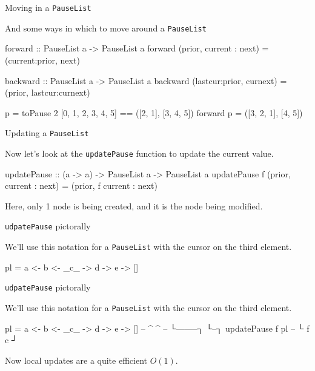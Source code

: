 \documentclass[ignorenonframetext,]{beamer}
\begin{document}
\begin{frame}[fragile]{Moving in a \texttt{PauseList}}

And some ways in which to move around a \texttt{PauseList}

\begin{haskellcode}
forward :: PauseList a -> PauseList a
forward (prior, current : next) = (current:prior, next)

backward :: PauseList a -> PauseList a
backward (lastcur:prior, curnext) = (prior, lastcur:curnext)
\end{haskellcode}

\pause

\begin{haskellcode}
p = toPause 2 [0, 1, 2, 3, 4, 5] == ([2, 1], [3, 4, 5])
forward p = ([3, 2, 1], [4, 5])
\end{haskellcode}

\end{frame}

\begin{frame}[fragile]{Updating a \texttt{PauseList}}

Now let's look at the \texttt{updatePause} function to update the
current value.

\begin{haskellcode}
updatePause :: (a -> a) -> PauseList a -> PauseList a
updatePause f (prior, current : next) = (prior, f current : next)
\end{haskellcode}

Here, only 1 node is being created, and it is the node being modified.

\end{frame}

\begin{frame}[fragile]{\texttt{udpatePause} pictorally}

We'll use this notation for a \texttt{PauseList} with the cursor on the
third element.

\begin{haskellcode}
 pl =  a <- b <- _c_ -> d -> e -> []
\end{haskellcode}

\end{frame}

\begin{frame}[fragile]{\texttt{udpatePause} pictorally}

We'll use this notation for a \texttt{PauseList} with the cursor on the
third element.

\begin{haskellcode}
 pl =  a <- b <- _c_ -> d -> e -> []
--          ^           ^
--          └--------┐  └--┐
updatePause f pl --  └ f c ┘
\end{haskellcode}

Now local updates are a quite efficient \(O(1)\).

\end{frame}
\end{document}
